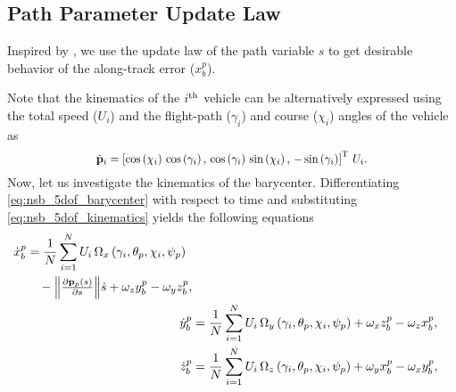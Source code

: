 \subsection{Path Parameter Update Law}
\label{sec:nsb_5dof_path_parameter}
Inspired by \cite{belleter_2019_observer}, we use the update law of the path variable $s$ to get desirable behavior of the along-track error ($x_b^p$).

Note that the kinematics of the $i^{\rm th}$ vehicle can be alternatively expressed using the total speed ($U_i$) and the flight-path ($\gamma_i$) and course ($\chi_i$) angles of the vehicle as
\begin{equation}
    \scale[0.91]{\dot{\mat{p}}_i = \left[\cos\left(\chi_i\right)\,\cos\left(\gamma_i\right) ,\, \cos\left(\gamma_i\right)\,\sin\left(\chi_i\right) ,\, -\sin\left(\gamma_i\right)\right]\T \, U_i.} \label{eq:nsb_5dof_kinematics}
\end{equation}
Now, let us investigate the kinematics of the barycenter.
Differentiating \eqref{eq:nsb_5dof_barycenter} with respect to time and substituting \eqref{eq:nsb_5dof_kinematics} yields the following equations
\begin{subequations}
    \begin{align}
        \begin{split}
            \dot{x}_b^p &= \frac{1}{N}\sum_{i=1}^N U_i\,\Omega_x\left(\gamma_i, \theta_p, \chi_i, \psi_p\right) \\
            &\quad - \scale{\norm{\frac{\partial \mat{p}_p(s)}{\partial s}}}\dot{s} + \omega_zy_b^p - \omega_yz_b^p,
        \end{split} \label{eq:nsb_5dof_x_pb} \\
        \dot{y}_b^p &= \frac{1}{N}\sum_{i=1}^N U_i\,\Omega_y\left(\gamma_i, \theta_p, \chi_i, \psi_p\right) + \omega_xz_b^p - \omega_zx_b^p, \label{eq:nsb_5dof_y_pb} \\
        \dot{z}_b^p &= \frac{1}{N}\sum_{i=1}^N U_i\,\Omega_z\left(\gamma_i, \theta_p, \chi_i, \psi_p\right) + \omega_yx_b^p - \omega_xy_b^p, \label{eq:nsb_5dof_z_pb}
    \end{align} \label{eq:nsb_5dof_barycenter_kinematics}
\end{subequations}
